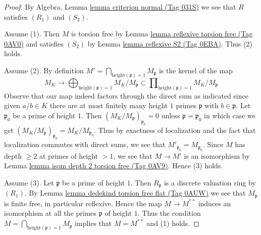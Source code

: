 \documentclass{amsart}
\theoremstyle{plain}
\theoremstyle{definition}
\theoremstyle{remark}
\numberwithin{equation}{subsection}
\begin{document}
\begin{proof}
By Algebra, Lemma \href{https://stacks.math.columbia.edu/tag/031S}{lemma criterion normal (Tag 031S)}
we see that $R$ satisfies $(R_1)$ and $(S_2)$.

\medskip\noindent
Assume (1). Then $M$ is torsion free by Lemma \href{https://stacks.math.columbia.edu/tag/0AV0}{lemma reflexive torsion free (Tag 0AV0)}
and satisfies $(S_2)$ by Lemma \href{https://stacks.math.columbia.edu/tag/0EBA}{lemma reflexive S2 (Tag 0EBA)}.
Thus (2) holds.

\medskip\noindent
Assume (2). By definition
$M' = \bigcap_{\text{height}(\mathfrak p) = 1} M_{\mathfrak p}$
is the kernel of the map
$$
M_K
\longrightarrow
\bigoplus\nolimits_{\text{height}(\mathfrak p) = 1} M_K/M_\mathfrak p
\subset
\prod\nolimits_{\text{height}(\mathfrak p) = 1} M_K/M_\mathfrak p
$$
Observe that our map indeed factors through the direct sum as indicated
since given
$a/b \in K$ there are at most finitely many height $1$ primes $\mathfrak p$
with $b \in \mathfrak p$. Let $\mathfrak p_0$ be a prime of height $1$.
Then $(M_K/M_\mathfrak p)_{\mathfrak p_0} = 0$ unless
$\mathfrak p = \mathfrak p_0$ in which case we get
$(M_K/M_\mathfrak p)_{\mathfrak p_0} = M_K/M_{\mathfrak p_0}$.
Thus by exactness of localization and the fact that localization
commutes with direct sums, we see that
$M'_{\mathfrak p_0} = M_{\mathfrak p_0}$.
Since $M$ has depth $\geq 2$ at primes of height $> 1$,
we see that $M \to M'$ is an isomorphism by
Lemma \href{https://stacks.math.columbia.edu/tag/0AV9}{lemma isom depth 2 torsion free (Tag 0AV9)}. Hence (3) holds.

\medskip\noindent
Assume (3). Let $\mathfrak p$ be a prime of height $1$.
Then $R_\mathfrak p$ is a discrete valuation ring by $(R_1)$.
By Lemma \href{https://stacks.math.columbia.edu/tag/0AUW}{lemma dedekind torsion free flat (Tag 0AUW)}
we see that $M_\mathfrak p$ is finite free, in particular
reflexive. Hence the map $M \to M^{**}$ induces an isomorphism at all
the primes $\mathfrak p$ of height $1$. Thus the condition
$M = \bigcap_{\text{height}(\mathfrak p) = 1} M_{\mathfrak p}$
implies that $M = M^{**}$ and (1) holds.
\end{proof}
\end{document}
